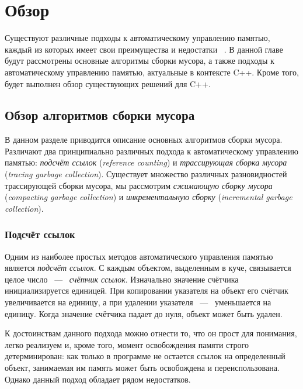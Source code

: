 \section{Обзор}

Существуют различные подходы к автоматическому управлению памятью, 
каждый из которых имеет свои преимущества и недостатки
~\cite{book:jones1996garbage,book:jones2011garbage}. 
В данной главе будут рассмотрены основные алгоритмы сборки мусора, 
а также подходы к автоматическому управлению памятью, актуальные в 
контексте C++. 
Кроме того, будет выполнен обзор существующих решений для C++. 


\subsection{Обзор алгоритмов сборки мусора}

В данном разделе приводится описание основных алгоритмов сборки мусора. 
Различают два принципиально различных подхода к автоматическому управлению памятью: 
\emph{подсчёт ссылок} (\emph{reference counting}) и \emph{трассирующая сборка мусора} 
(\emph{tracing garbage collection}). 
Существует множество различных разновидностей трассирующей сборки мусора, 
мы рассмотрим \emph{сжимающую сборку мусора} (\emph{compacting garbage collection}) и 
\emph{инкрементальную сборку} (\emph{incremental garbage collection}).  


\subsubsection{Подсчёт ссылок}
\label{sec:ref_cnt}

Одним из наиболее простых методов автоматического управления памятью является 
\emph{подсчёт ссылок}. 
С каждым объектом, выделенным в куче, связывается целое число ~---~ \emph{счётчик ссылок}. 
Изначально значение счётчика инициализируется единицей. 
При копировании указателя на объект его счётчик увеличивается на единицу, 
а при удалении указателя ~---~ уменьшается на единицу. 
Когда значение счётчика падает до нуля, объект может быть удален. 

К достоинствам данного подхода можно отнести то, что он прост для понимания, 
легко реализуем и, кроме того, момент освобождения памяти строго детерминирован: 
как только в программе не остается ссылок на определенный объект, 
занимаемая им память может быть освобождена и переиспользована. 
Однако данный подход обладает рядом недостатков.

